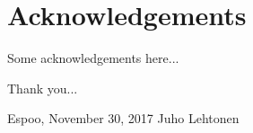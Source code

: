 \documentclass[12pt,a4paper,oneside,pdftex]{report}
\newcommand{\DATE}{November 30, 2017}
\newcommand{\AUTHOR}{Juho Lehtonen}
\begin{document}

\chapter*{Acknowledgements}

Some acknowledgements here...

Thank you...
\vskip 10mm

\noindent Espoo, \DATE
\vskip 5mm
\noindent\AUTHOR

\cleardoublepage
% 

\cleardoublepage
\tableofcontents



\label{pages-prelude}
\cleardoublepage

\startfirstchapter
\end{document}
